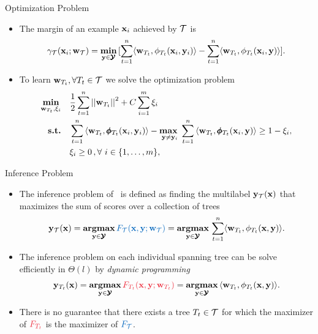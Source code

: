 \documentclass[first=dgreen,second=purple,logo=yellowexc]{aaltoslides}
\begin{document}
%
\begin{frame}{Optimization Problem}
	\begin{itemize}
		\item The margin of an example $\mathbf {x}_i$ achieved by $\mathcal{T}$ is
		\begin{align*}
		\gamma_{\mathcal{T}}(\mathbf {x}_i;\mathbf {w}_{\mathcal{T}}) = \underset{\mathbf {y}\in\pmb {\mathcal{Y}}}{\textbf{min}}\,[\sum_{t=1}^{n}\langle \mathbf {w}_{T_t}, \phi_{T_t}(\mathbf {x}_i,\mathbf {y}_i) \rangle-\sum_{t=1}^{n}\langle \mathbf {w}_{T_t}, \phi_{T_t}(\mathbf {x}_i,\mathbf {y}) \rangle].
	\end{align*}
		\item To learn $\mathbf {w}_{T_t},\forall T_t\in\mathcal{T}$ we solve the optimization problem
		\begin{align*}
			\underset{\vw_{T_t},\xi_i}{\minimize} & \quad \frac{1}{2}\sum_{t=1}^{n}\norm{\vw_{T_t}}^2 + C\sum_{i=1}^{m}\xi_i\\
			\st & \quad \sum_{t=1}^{n}{ \langle \vw_{T_t}, \phib_{T_t}(\vx_i,\vy_i) \rangle} - \underset{\vy \neq \vy_i}{\maximize\ } \sum_{t=1}^{n}{\langle \vw_{T_t}, \phib_{T_t}(\vx_i,\vy) \rangle } \geq 1 -  \xi_i, \\
			& \quad \xi_i\ge0\, , \forall\ i \in \set{1,\dots,m},
		\end{align*}
	\end{itemize}
\end{frame}



%
\begin{frame}{Inference Problem}
	\begin{itemize}
		\item The inference problem of \rta\ is defined as finding the multilabel $\mathbf {y}_{\mathcal{T}}(\mathbf {x})$ that maximizes the sum of scores over a collection of trees
		\begin{align*}
			\vy_{\Tcal}(\vx) = \underset{\vy\in\vYcal}{\argmax}\,{\color{aaltoblue}F_{\Tcal}(\vx,\vy;\vw_{\Tcal})} = \underset{\vy\in\vYcal}{\argmax}\,\sum_{t=1}^{n}\ip{\vw_{T_t}}{\phi_{T_t}(\vx,\vy)}.
		\end{align*}
		\item The inference problem on each individual spanning tree can be solve efficiently in $\Theta(l)$ by \textit{dynamic programming}
		\begin{align*}
			\vy_{T_t}(\vx) = \underset{\vy\in\vYcal}{\argmax}\,{\color{aaltored}F_{T_t}(\vx,\vy;\vw_{T_t})}= \underset{\vy\in\vYcal}{\argmax}\,\ip{\vw_{T_t}}{\phi_{T_t}(\vx,\vy)}.
		\end{align*}
		\item There is no guarantee that there exists a tree $T_t\in\mathcal{T}$ for which the maximizer of ${\color{aaltored}F_{T_t}}$ is the maximizer of ${\color{aaltoblue}F_{\Tcal}}$.
	\end{itemize}
\end{frame}
\end{document}
